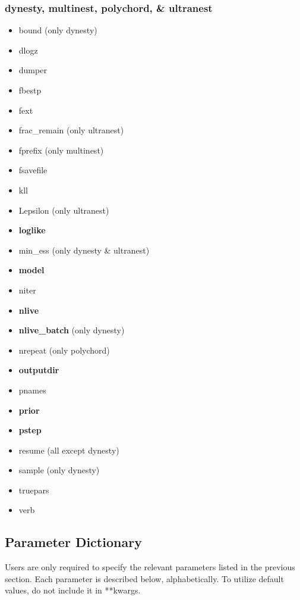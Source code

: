 \documentclass[letterpaper, 12pt]{article}
\begin{document}
\subsubsection{dynesty, multinest, polychord, \& ultranest}
\label{sec:ns-inputs}
\begin{itemize}
\item bound (only dynesty)
\item dlogz
\item dumper
\item fbestp
\item fext
\item frac\_remain (only ultranest)
\item fprefix (only multinest)
\item fsavefile
\item kll
\item Lepsilon (only ultranest)
\item \textbf{loglike}
\item min\_ess (only dynesty \& ultranest)
\item \textbf{model}
\item niter
\item \textbf{nlive}
\item \textbf{nlive\_batch} (only dynesty)
\item nrepeat (only polychord)
\item \textbf{outputdir}
\item pnames
\item \textbf{prior}
\item \textbf{pstep}
\item resume (all except dynesty)
\item sample (only dynesty)
\item truepars
\item verb
\end{itemize}

\subsection{Parameter Dictionary}
\label{sec:param-desc}

Users are only required to specify the relevant parameters listed in 
the previous section.  Each parameter is described below, alphabetically.
To utilize default values, do not include it in **kwargs.
\end{document}
